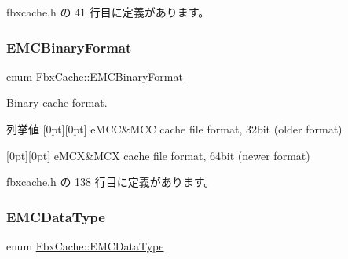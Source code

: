  fbxcache.\+h の 41 行目に定義があります。

\mbox{\label{class_fbx_cache_af3afea849dd371f0b5ecbe135d34b829}} 
\subsubsection{\texorpdfstring{E\+M\+C\+Binary\+Format}{EMCBinaryFormat}}
{\footnotesize\ttfamily enum \hyperlink{class_fbx_cache_af3afea849dd371f0b5ecbe135d34b829}{Fbx\+Cache\+::\+E\+M\+C\+Binary\+Format}}



Binary cache format. 

\begin{DoxyEnumFields}{列挙値}
[0pt][0pt]{}\mbox{\label{class_fbx_cache_af3afea849dd371f0b5ecbe135d34b829af019bf2bf0ab0788673f38da0364570c}} 
e\+M\+CC&M\+CC cache file format, 32bit (older format) \\
\hline

[0pt][0pt]{}\mbox{\label{class_fbx_cache_af3afea849dd371f0b5ecbe135d34b829a9f9f7cbd770451b48ea473902dd04568}} 
e\+M\+CX&M\+CX cache file format, 64bit (newer format) \\
\hline

\end{DoxyEnumFields}


 fbxcache.\+h の 138 行目に定義があります。

\mbox{\label{class_fbx_cache_a80f82fa5f485ff6c46565ffb151998b3}} 
\subsubsection{\texorpdfstring{E\+M\+C\+Data\+Type}{EMCDataType}}
{\footnotesize\ttfamily enum \hyperlink{class_fbx_cache_a80f82fa5f485ff6c46565ffb151998b3}{Fbx\+Cache\+::\+E\+M\+C\+Data\+Type}}



